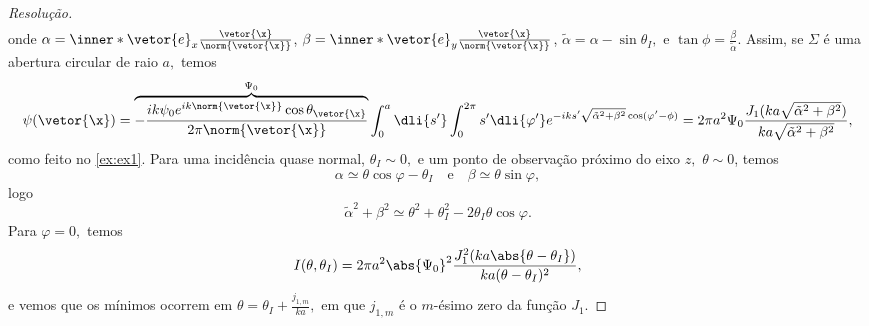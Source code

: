 \begin{proof}[Resolução]
\begin{align*}
    \end{align*}
    onde \(\alpha = \inner*{\vetor{e}_x}{\frac{\vetor{\x}}{\norm{\vetor{\x}}}}\), \(\beta = \inner*{\vetor{e}_y}{\frac{\vetor{\x}}{\norm{\vetor{\x}}}}\), \(\tilde{\alpha} = \alpha - \sin\theta_I,\) e \(\tan\phi = \frac{\beta}{\tilde{\alpha}}.\) Assim, se \(\Sigma\) é uma abertura circular de raio \(a,\) temos
    \begin{equation*}
        \psi(\vetor{\x}) = \overbrace{-\frac{ik \psi_0 e^{ik \norm{\vetor{\x}}}\cos\theta_{\vetor{\x}}}{2\pi \norm{\vetor{\x}}}}^{\Psi_0} \int_{0}^{a} \dli{s'} \int_0^{2\pi} s'\dli{\varphi'} e^{-ik s' \sqrt{\tilde{\alpha}^2 + \beta^2} \cos(\varphi' - \phi)} = 2\pi a^2 \Psi_0 \frac{J_1(ka\sqrt{\tilde{\alpha}^2 + \beta^2})}{ka\sqrt{\tilde{\alpha}^2 + \beta^2}},
    \end{equation*}
    como feito no \cref{ex:ex1}. Para uma incidência quase normal, \(\theta_I \sim 0,\) e um ponto de observação próximo do eixo \(z,\) \(\theta \sim 0\), temos
    \begin{equation*}
        \alpha \simeq \theta \cos\varphi - \theta_I
        \quad\text{e}\quad
        \beta \simeq \theta \sin\varphi,
    \end{equation*}
    logo
    \begin{equation*}
        \tilde{\alpha}^2 + \beta^2 \simeq \theta^2 + \theta_I^2 - 2\theta_I \theta \cos\varphi.
    \end{equation*}
    Para \(\varphi = 0,\) temos
    \begin{equation*}
        I(\theta,\theta_I) = 2\pi a^2 \abs{\Psi_0}^2 \frac{J_1^2(ka\abs{\theta - \theta_I})}{ka(\theta - \theta_I)^2},
    \end{equation*}
    e vemos que os mínimos ocorrem em \(\theta = \theta_I + \frac{j_{1,m}}{k a},\) em que \(j_{1,m}\) é o \(m\)-ésimo zero da função \(J_1.\)
\end{proof}
